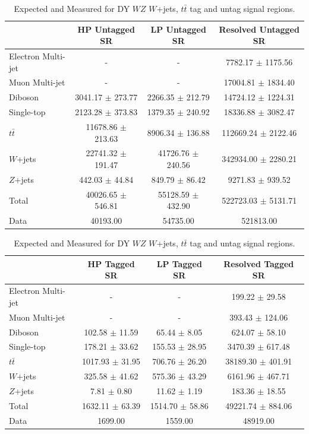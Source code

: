\begin{table}
\begin{tabular}{|l|c|c|c|}
\hline
	  &	 HP Untagged SR &	 LP Untagged SR &	Resolved Untagged SR \\\hline 
	Electron Multi-jet &	- &	- &	7782.17 $\pm$ 1175.56 \\\hline 
	Muon Multi-jet &	- &	- &	17004.81 $\pm$ 1834.40 \\\hline 
	Diboson &	3041.17 $\pm$ 273.77 &	2266.35 $\pm$ 212.79 &	14724.12 $\pm$ 1224.31 \\\hline 
	Single-top &	2123.28 $\pm$ 373.83 &	1379.35 $\pm$ 240.92 &	18336.88 $\pm$ 3082.47 \\\hline 
	$t\bar{t}$ &	11678.86 $\pm$ 213.63 &	8906.34 $\pm$ 136.88 &	112669.24 $\pm$ 2122.46 \\\hline 
	$W$+jets &	22741.32 $\pm$ 191.47 &	41726.76 $\pm$ 240.56 &	342934.00 $\pm$ 2280.21 \\\hline 
	$Z$+jets &	442.03 $\pm$ 44.84 &	849.79 $\pm$ 86.42 &	9271.83 $\pm$ 939.52 \\\hline 
	Total &	40026.65 $\pm$ 546.81 &	55128.59 $\pm$ 432.90 &	522723.03 $\pm$ 5131.71 \\\hline 
	Data &	40193.00 &	54735.00 &	521813.00 \\\hline 
\end{tabular}

\begin{tabular}{|l|c|c|c|}
\hline
	  &	 HP Tagged SR &	 LP Tagged SR &	Resolved Tagged SR \\\hline 
	Electron Multi-jet &	- &	- &	199.22 $\pm$ 29.58 \\\hline 
	Muon Multi-jet &	- &	- &	393.43 $\pm$ 124.06 \\\hline 
	Diboson &	102.58 $\pm$ 11.59 &	65.44 $\pm$ 8.05 &	624.07 $\pm$ 58.10 \\\hline 
	Single-top &	178.21 $\pm$ 33.62 &	155.53 $\pm$ 28.95 &	3470.39 $\pm$ 617.48 \\\hline 
	$t\bar{t}$ &	1017.93 $\pm$ 31.95 &	706.76 $\pm$ 26.20 &	38189.30 $\pm$ 401.91 \\\hline 
	$W$+jets &	325.58 $\pm$ 41.62 &	575.36 $\pm$ 43.29 &	6161.96 $\pm$ 467.71 \\\hline 
	$Z$+jets &	7.81 $\pm$ 0.80 &	11.62 $\pm$ 1.19 &	183.36 $\pm$ 18.55 \\\hline 
	Total &	1632.11 $\pm$ 63.39 &	1514.70 $\pm$ 58.86 &	49221.74 $\pm$ 884.06 \\\hline 
	Data &	1699.00 &	1559.00 &	48919.00 \\\hline 
\end{tabular}
\caption{Expected and Measured for DY $WZ$ $W$+jets, $t\bar{t}$ tag and untag signal regions.}
\label{tbl:hvtwz_yields_tcr}
\end{table}

